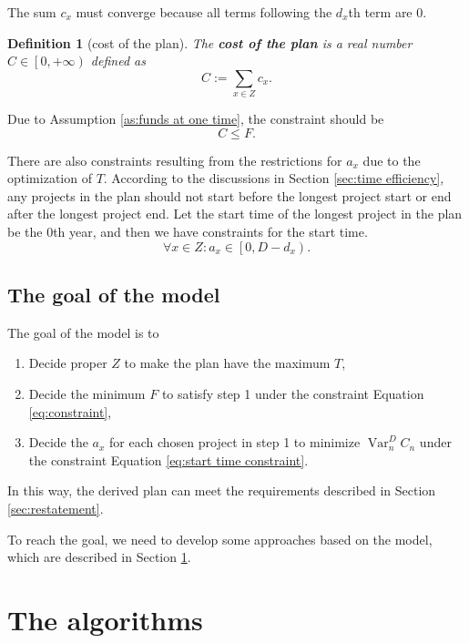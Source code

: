 \documentclass{article}
\DeclareMathOperator*{\var}{Var}
\newtheorem{definition}{Definition}
\begin{document}
The sum $c_x$ must converge because all terms following the $d_x$th term are $0$.

\begin{definition}[cost of the plan]
The \textbf{cost of the plan} is a real number $C\in\left[0,+\infty\right)$ defined as
\begin{equation}
C:=\sum_{x\in Z}c_x.
\end{equation}
\end{definition}

Due to Assumption \ref{as:funds at one time}, the constraint should be
\begin{equation}
\label{eq:constraint}
C\le F.
\end{equation}

There are also constraints resulting from the restrictions for $a_x$ due to the optimization of $T$.
According to the discussions in Section \ref{sec:time efficiency}, any projects in the plan should not start before the longest project start or end after the longest project end.
Let the start time of the longest project in the plan be the $0$th year, and then we have constraints for the start time.
\begin{equation}
\label{eq:start time constraint}
\forall x\in Z:a_x\in\left[0,D-d_x\right).
\end{equation}

\subsection{The goal of the model}
\label{sec:goal}

The goal of the model is to
\begin{enumerate}
\item Decide proper $Z$ to make the plan have the maximum $T$,
\item Decide the minimum $F$ to satisfy step 1 under the constraint Equation \ref{eq:constraint},
\item Decide the $a_x$ for each chosen project in step 1 to minimize $\var_n^DC_n$ under the constraint Equation \ref{eq:start time constraint}.
\end{enumerate}

In this way, the derived plan can meet the requirements described in Section \ref{sec:restatement}.

To reach the goal, we need to develop some approaches based on the model,
which are described in Section \ref{sec:approach}.

\section{The algorithms}
\label{sec:approach}
\end{document}

